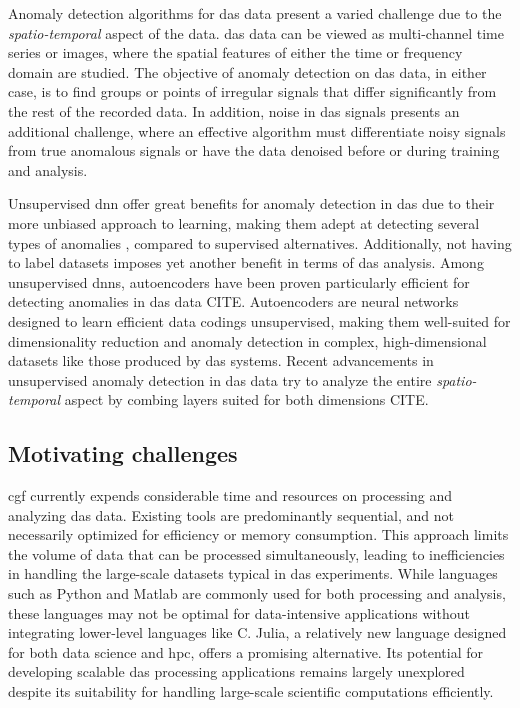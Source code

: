 
Anomaly detection algorithms for \acrshort{das} data present a varied challenge due to the \textit{spatio-temporal} aspect of the data. \acrshort{das} data can be viewed as multi-channel time series or images, where the spatial features of either the time or frequency domain are studied. The objective of anomaly detection on \acrshort{das} data, in either case, is to find groups or points of irregular signals that differ significantly from the rest of the recorded data. In addition, noise in \acrshort{das} signals presents an additional challenge, where an effective algorithm must differentiate noisy signals from true anomalous signals or have the data denoised before or during training and analysis.

Unsupervised \acrfull{dnn} offer great benefits for anomaly detection in \acrshort{das} due to their more unbiased approach to learning, making them adept at detecting several types of anomalies \cite{wei2022lstmautoencoder, srivastava2016unsupervised}, compared to supervised alternatives. Additionally, not having to label datasets imposes yet another benefit in terms of \acrshort{das} analysis. Among unsupervised \acrshort{dnn}s, autoencoders have been proven particularly efficient for detecting anomalies in \acrshort{das} data CITE. Autoencoders are neural networks designed to learn efficient data codings unsupervised, making them well-suited for dimensionality reduction and anomaly detection in complex, high-dimensional datasets like those produced by \acrshort{das} systems. Recent advancements in unsupervised anomaly detection in \acrshort{das} data try to analyze the entire \textit{spatio-temporal} aspect by combing layers suited for both dimensions CITE.

\subsection{Motivating challenges}

\acrshort{cgf} currently expends considerable time and resources on processing and analyzing \acrshort{das} data. Existing tools are predominantly sequential, and not necessarily optimized for efficiency or memory consumption. This approach limits the volume of data that can be processed simultaneously, leading to inefficiencies in handling the large-scale datasets typical in \acrshort{das} experiments. 
While languages such as Python and Matlab are commonly used for both processing and analysis, these languages may not be optimal for data-intensive applications without integrating lower-level languages like C. Julia, a relatively new language designed for both data science and \acrfull{hpc}, offers a promising alternative. Its potential for developing scalable \acrshort{das} processing applications remains largely unexplored despite its suitability for handling large-scale scientific computations efficiently. 

